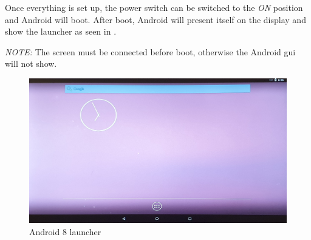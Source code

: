 Once everything is set up, the power switch can be switched to the \emph{ON}
position and Android will boot.
After boot, Android will present itself on the display and show the launcher
as seen in .

\emph{NOTE:} The screen must be connected before boot, otherwise the Android
\gls{gui} will not show.

\begin{figure}[htbp]
    \centering
    \includegraphics[width=1\textwidth]{images/android-launcher.jpg}
    \caption{\label{fig:androiddisplay} Android 8 launcher}
\end{figure}
